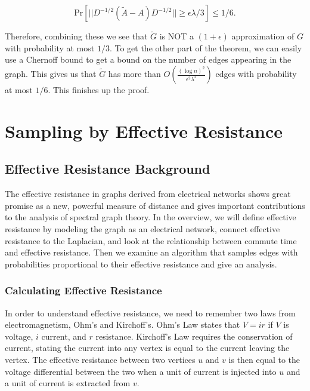 \documentclass[12pt,twoside]{article}
\begin{document}
\begin{equation}
\text{Pr}[||D^{-1/2}(\tilde{A} - A)D^{-1/2}|| \geq \epsilon\lambda/3] \leq 1/6.
\end{equation}

Therefore, combining these we see that $\tilde{G}$ is NOT a $(1 + \epsilon)$ approximation of $G$ with probability at most $1/3$. To get the other part of the theorem, we can easily use a Chernoff bound to get a bound on the number of edges appearing in the graph. This gives us that $\tilde{G}$ has more than $O\left(\frac{(\log n)^2}{\epsilon^2\lambda^2}\right)$ edges with probability at most $1/6$. This finishes up the proof.


\section{Sampling by Effective Resistance}

\subsection{Effective Resistance Background}

The effective resistance in graphs derived from electrical networks shows great promise as a new, powerful measure of distance and gives important contributions to the analysis of spectral graph theory. In the overview, we will define effective resistance by modeling the graph as an electrical network, connect effective resistance to the Laplacian, and look at the relationship between commute time and effective resistance. Then we examine an algorithm that samples edges with probabilities proportional to their effective resistance and give an analysis. 

\subsubsection{Calculating Effective Resistance}


In order to understand effective resistance, we need to remember two laws from electromagnetism, Ohm's and Kirchoff's. Ohm's Law states that $V=ir$ if $V$ is voltage, $i$ current, and $r$ resistance. Kirchoff's Law requires the conservation of current, stating the current into any vertex is equal to the current leaving the vertex. The effective resistance between two vertices $u$ and $v$ is then equal to the voltage differential between the two when a unit of current is injected into $u$ and a unit of current is extracted from $v$.
\end{document}
